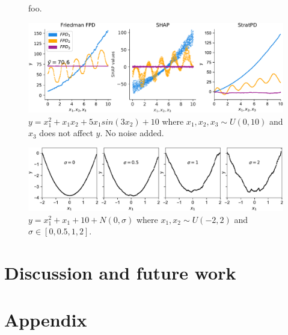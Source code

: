 \documentclass{article}
\begin{document}
\begin{figure}[htbp]
\begin{center}
\caption{\small foo.}
\label{fig:pregnant}
\end{center}
\end{figure}

\begin{figure}[htbp]
\begin{center}
\includegraphics[scale=0.4]{images/interactions.pdf}
\caption{\small $y = x_1^2 + x_1 x_2 + 5 x_1 sin(3 x_2) + 10$ where $x_1,x_2,x_3 \sim U(0,10)$ and $x_3$ does not affect $y$. No noise added.}
\label{fig:interactions}
\end{center}
\end{figure}

\begin{figure}[htbp]
\begin{center}
\includegraphics[scale=0.4]{images/noise.pdf}
\caption{\small $y = x_1^2 + x_1 + 10 + N(0,\sigma)$ where $x_1,x_2 \sim U(-2,2)$ and $\sigma \in [0,0.5,1,2]$.}
\label{fig:noise}
\end{center}
\end{figure}

\section{Discussion and future work}

\pagebreak
\section{Appendix}
\end{document}
